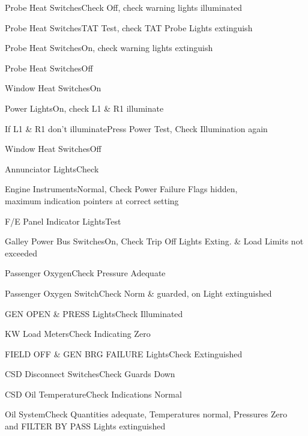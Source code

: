 \documentclass[sim-use, blue_items]{checklist}
\begin{document}
\begin{continuedchecklist}
	 {
		\item{Probe Heat Switches}{Check Off, check warning lights illuminated}
		\item{Probe Heat Switches}{TAT Test, check TAT Probe Lights extinguish}
		\item{Probe Heat Switches}{On, check warning lights extinguish}
		\item{Probe Heat Switches}{Off}
	}
	 {
		\item{Window Heat Switches}{On}
		\item{Power Lights}{On, check L1 \& R1 illuminate}
		\item{If L1 \& R1 don't illuminate}{Press Power Test, Check Illumination again}
		\item{Window Heat Switches}{Off}
	}
	\item{Annunciator Lights}{Check}
	\item{Engine Instruments}{Normal, Check Power Failure Flags hidden,\\maximum indication pointers at correct setting}
	\item{F/E Panel Indicator Lights}{Test} %
	\item{Galley Power Bus Switches}{On, Check Trip Off Lights Exting. \& Load Limits not exceeded}
	\item{Passenger Oxygen}{Check Pressure Adequate}
	\item{Passenger Oxygen Switch}{Check Norm \& guarded, on Light extinguished}
	 {
		\item{GEN OPEN \& PRESS Lights}{Check Illuminated}
		\item{KW Load Meters}{Check Indicating Zero}
		\item{FIELD OFF \& GEN BRG FAILURE Lights}{Check Extinguished}
		\item{CSD Disconnect Switches}{Check Guards Down}
		\item{CSD Oil Temperature}{Check Indications Normal}
	}
	\item{Oil System}{Check Quantities adequate, Temperatures normal, Pressures Zero\\and FILTER BY PASS Lights extinguished}
\end{continuedchecklist}
\end{document}

